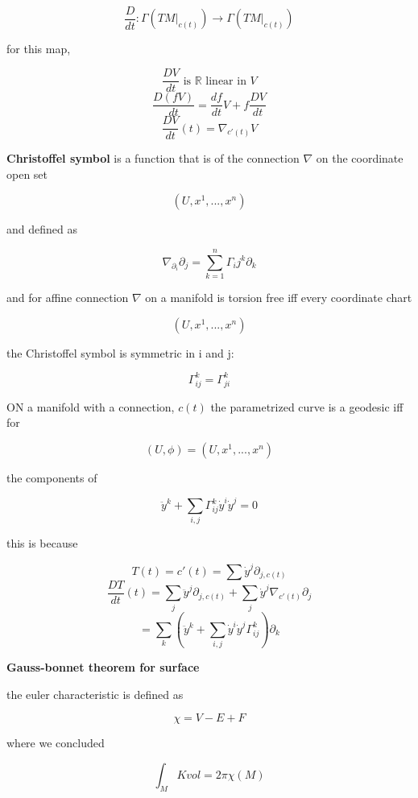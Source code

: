 \documentclass{article}
\begin{document}
\[
\frac{D}{dt}: \Gamma(TM|_{c(t)})\rightarrow \Gamma(TM|_{c(t)})
\]

for this map, 

\[
\frac{DV}{dt} \text{ is } \mathbb{R} \text{ linear in } V
\]
\[
\frac{D(fV)}{dt}=\frac{df}{dt}V+f\frac{DV}{dt}
\]
\[
\frac{DV}{dt}(t)=\nabla_{c'(t)}V
\]

\textbf{Christoffel symbol} is a function that is of the connection $\nabla$ on the coordinate open set 

\[
(U,x^1,...,x^n)
\]

and defined as 

\[
\nabla_{\partial_i}\partial_j=\sum_{k=1}^n \Gamma_ij^k \partial_k 
\]

and for affine connection $\nabla$ on a manifold is torsion free iff every coordinate chart 

\[
(U,x^1,...,x^n) 
\]

the Christoffel symbol is symmetric in i and j:

\[
\Gamma_{ij}^k=\Gamma_{ji}^k
\]

ON a manifold with a connection, $c(t)$ the parametrized curve is a geodesic iff for

\[
(U,\phi)=(U,x^1,...,x^n)
\]

the components of 

\[
\ddot{y}^k+\sum_{i,j}\Gamma_{ij}^k\dot{y}^i\dot{y}^j=0
\]

this is because

\[
T(t)=c'(t)=\sum \dot{y}^j\partial_{j,c(t)}
\]
\[
\frac{DT}{dt}(t)=\sum_j\ddot{y}^j\partial_{j,c(t)}+\sum_j\dot{y}^j\nabla_{c'(t)}\partial_j
\]
\[
=\sum_k(\ddot{y}^k+\sum_{i,j}\dot{y}^i\dot{y}^j\Gamma_{ij}^k)\partial_k
\]

\textbf{Gauss-bonnet theorem for surface}

the euler characteristic is defined as

\[
\chi = V-E+F
\]

where we concluded

\[
\int_MKvol=2\pi \chi(M)
\]
\end{document}
